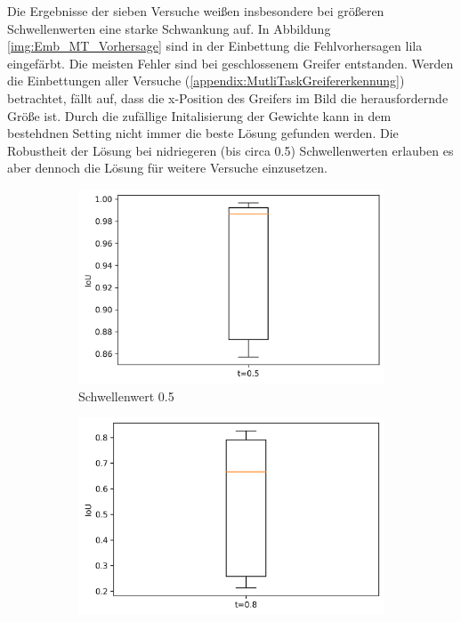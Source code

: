 	Die Ergebnisse der sieben Versuche weißen insbesondere bei größeren Schwellenwerten eine starke Schwankung auf. In Abbildung \ref{img:Emb_MT_Vorhersage} sind in der Einbettung die Fehlvorhersagen lila eingefärbt. Die meisten Fehler sind bei geschlossenem Greifer entstanden. Werden die Einbettungen aller Versuche (\ref{appendix:MutliTaskGreifererkennung}) betrachtet, fällt auf, dass die x-Position des Greifers im Bild die herausfordernde Größe ist. Durch die zufällige Initalisierung der Gewichte kann in dem bestehdnen Setting nicht immer die beste Lösung gefunden werden. Die Robustheit der Lösung bei nidriegeren (bis circa 0.5) Schwellenwerten erlauben es aber dennoch die Lösung für weitere Versuche einzusetzen.
	    \begin{figure}[h]
		\centering
		\begin{subfigure}[c]{0.32\textwidth}			
			\includegraphics[width=1\textwidth,center]{bilder/Hauptteil/MT_Grapple/IoU_05_MT_Grapple.png}
			\caption{Schwellenwert 0.5}
			\label{img:BoxPlot_05_MT-Ansatz}	
		\end{subfigure}
		\centering
		\begin{subfigure}[c]{0.32\textwidth}			
			\includegraphics[width=1\textwidth,center]{bilder/Hauptteil/MT_Grapple/IoU_08_MT_Grapple.png}

\end{subfigure}
\end{figure}
